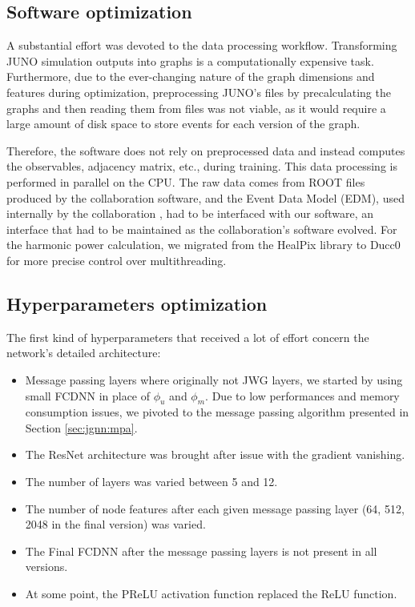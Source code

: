 \documentclass[../main.tex]{subfiles}
\begin{document}
\subsection{Software optimization}


A substantial effort was devoted to the data processing workflow. Transforming JUNO simulation outputs into graphs is a computationally expensive task. Furthermore, due to the ever-changing nature of the graph dimensions and features during optimization, preprocessing JUNO's files by precalculating the graphs and then reading them from files was not viable, as it would require a large amount of disk space to store events for each version of the graph.

Therefore, the software does not rely on preprocessed data and instead computes the observables, adjacency matrix, etc., during training. This data processing is performed in parallel on the CPU. The raw data comes from ROOT files produced by the collaboration software, and the Event Data Model (EDM), used internally by the collaboration \cite{li_design_2017}, had to be interfaced with our software, an interface that had to be maintained as the collaboration's software evolved. For the harmonic power calculation, we migrated from the HealPix library to Ducc0 \cite{reinecke_ducc0_2024} for more precise control over multithreading.

\subsection{Hyperparameters optimization}

The first kind of hyperparameters that received a lot of effort concern the network's detailed architecture:
\begin{itemize}
  \item Message passing layers where originally not JWG layers, we started by using small FCDNN in place of $\phi_u$ and $\phi_m$. Due to low performances and memory consumption issues, we pivoted to the message passing algorithm presented in Section \ref{sec:jgnn:mpa}.

  \item The ResNet architecture was brought after issue with the gradient vanishing.

  \item The number of layers was varied between 5 and 12.

  \item The number of node features after each given message passing layer (64, 512, 2048 in the final version) was varied.

  \item The Final FCDNN after the message passing layers is not present in all versions.

  \item At some point, the PReLU activation function replaced the ReLU function.
\end{itemize}
\end{document}
